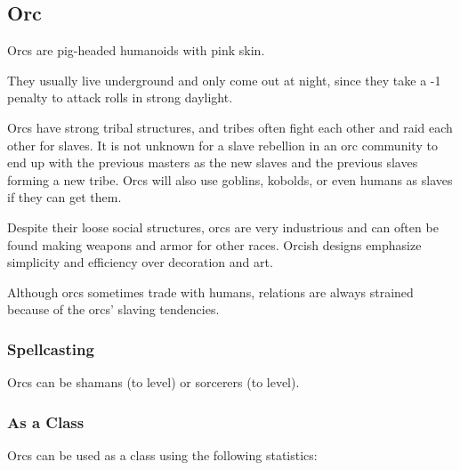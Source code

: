 \begin{multicols*}{2}
\subsection{Orc}

Orcs are pig-headed humanoids with pink skin.

They usually live underground and only come out at night, since they take a -1 penalty to attack rolls in strong daylight.

Orcs have strong tribal structures, and tribes often fight each other and raid each other for slaves. It is not unknown for a slave rebellion in an orc community to end up with the previous masters as the new slaves and the previous slaves forming a new tribe. Orcs will also use goblins, kobolds, or even humans as slaves if they can get them.

Despite their loose social structures, orcs are very industrious and can often be found making weapons and armor for other races. Orcish designs emphasize simplicity and efficiency over decoration and art.

Although orcs sometimes trade with humans, relations are always strained because of the orcs’ slaving tendencies.

\subsubsection{Spellcasting}
Orcs can be shamans (to  level) or sorcerers (to  level).

\subsubsection{As a Class}
Orcs can be used as a class using the following statistics:


\end{multicols*}
